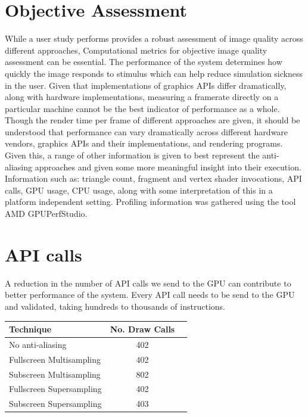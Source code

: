 \documentclass[12pt,a4paper,twoside,openright]{report}
\begin{document}
\section{Objective Assessment}

While a user study performs provides a robust assessment of image quality across different approaches, Computational metrics for objective image quality assessment can be essential. The performance of the system determines how quickly the image responds to stimulus which can help reduce simulation sickness in the user. Given that implementations of graphics APIs differ dramatically, along with hardware implementations, measuring a framerate directly on a particular machine cannot be the best indicator of performance as a whole. Though the render time per frame of different approaches are given, it should be understood that performance can vary dramatically across different hardware vendors, graphics APIs and their implementations, and rendering programs. Given this, a range of other information is given to best represent the anti-aliasing approaches and given some more meaningful insight into their execution. Information such as: triangle count, fragment and vertex shader invocations, API calls, GPU usage, CPU usage, along with some interpretation of this in a platform independent setting. Profiling information was gathered using the tool AMD GPUPerfStudio.

\section{API calls}

A reduction in the number of API calls we send to the GPU can contribute to better performance of the system. Every API call needs to be send to the GPU and validated, taking hundreds to thousands of instructions.

\begin{center}
\begin{tabular}{l|c|r}
Technique   & No. Draw Calls \\ 
\hline
No anti-aliasing      & 402 \\
Fullscreen Multisampling     & 402 \\
Subscreen Multisampling    &  802  \\
Fullscreen Supersampling      &  402   \\
Subscreen Supersampling    &  403  \\
\end{tabular}
\end{center}
\end{document}
